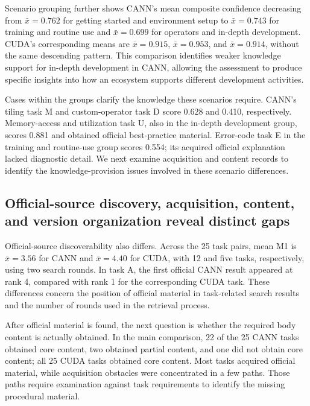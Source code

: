 \documentclass[manuscript,review,anonymous]{acmart}
\begin{document}
Scenario grouping further shows CANN's mean composite confidence decreasing from \(\bar{x}=0.762\) for getting started and environment setup to \(\bar{x}=0.743\) for training and routine use and \(\bar{x}=0.699\) for operators and in-depth development. CUDA's corresponding means are \(\bar{x}=0.915\), \(\bar{x}=0.953\), and \(\bar{x}=0.914\), without the same descending pattern. This comparison identifies weaker knowledge support for in-depth development in CANN, allowing the assessment to produce specific insights into how an ecosystem supports different development activities.

Cases within the groups clarify the knowledge these scenarios require. CANN's tiling task M and custom-operator task D score 0.628 and 0.410, respectively. Memory-access and utilization task U, also in the in-depth development group, scores 0.881 and obtained official best-practice material. Error-code task E in the training and routine-use group scores 0.554; its acquired official explanation lacked diagnostic detail. We next examine acquisition and content records to identify the knowledge-provision issues involved in these scenario differences.

\subsection{Official-source discovery, acquisition, content, and version organization reveal distinct gaps}\label{official-source-discovery-acquisition-content-and-version-organization-reveal-distinct-gaps}

Official-source discoverability also differs. Across the 25 task pairs, mean M1 is \(\bar{x}=3.56\) for CANN and \(\bar{x}=4.40\) for CUDA, with 12 and five tasks, respectively, using two search rounds. In task A, the first official CANN result appeared at rank 4, compared with rank 1 for the corresponding CUDA task. These differences concern the position of official material in task-related search results and the number of rounds used in the retrieval process.

After official material is found, the next question is whether the required body content is actually obtained. In the main comparison, 22 of the 25 CANN tasks obtained core content, two obtained partial content, and one did not obtain core content; all 25 CUDA tasks obtained core content. Most tasks acquired official material, while acquisition obstacles were concentrated in a few paths. Those paths require examination against task requirements to identify the missing procedural material.
\end{document}
